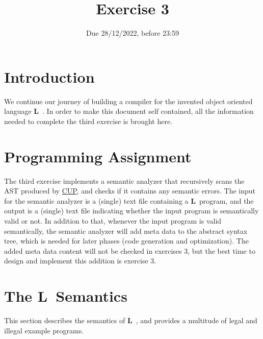 \documentclass{article}
\begin{document}
\title{Exercise 3}


\date{Due 28/12/2022, before 23:59}

\maketitle

\newcommand{\plname}{\textbf{L}\ }

\section{Introduction}
We continue our journey of building a compiler
for the invented object oriented language \plname.
In order to make this document self contained,
all the information needed to complete the third exercise is brought here.

\section{Programming Assignment}
The third exercise implements a semantic analyzer that
recursively scans the AST produced by
\href{http://www2.cs.tum.edu/projects/cup/}{CUP},
and checks if it contains any semantic errors.
The input for the semantic analyzer is a (single) text file containing a \plname program,
and the output is a (single) text file indicating whether the input program
is semantically valid or not.
In addition to that, whenever the input program is valid semantically,
the semantic analyzer will add meta data to the abstract syntax tree,
which is needed for later phases (code generation and optimization).
The added meta data content will not be checked in exercises $3$,
but the best time to design and implement this addition is
exercise $3$.

\section{The \plname Semantics}
This section describes the semantics of \plname,
and provides a multitude of legal and illegal example programs.
\end{document}
